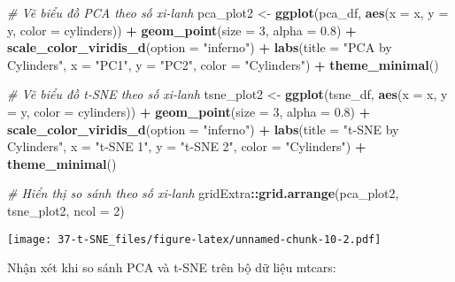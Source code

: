 \documentclass[
]{article}
\newenvironment{Shaded}{\begin{snugshade}}{\end{snugshade}}
\newcommand{\AttributeTok}[1]{\textcolor[rgb]{0.13,0.29,0.53}{#1}}
\newcommand{\CommentTok}[1]{\textcolor[rgb]{0.56,0.35,0.01}{\textit{#1}}}
\newcommand{\DecValTok}[1]{\textcolor[rgb]{0.00,0.00,0.81}{#1}}
\newcommand{\FloatTok}[1]{\textcolor[rgb]{0.00,0.00,0.81}{#1}}
\newcommand{\FunctionTok}[1]{\textcolor[rgb]{0.13,0.29,0.53}{\textbf{#1}}}
\newcommand{\NormalTok}[1]{#1}
\newcommand{\OtherTok}[1]{\textcolor[rgb]{0.56,0.35,0.01}{#1}}
\newcommand{\SpecialCharTok}[1]{\textcolor[rgb]{0.81,0.36,0.00}{\textbf{#1}}}
\newcommand{\StringTok}[1]{\textcolor[rgb]{0.31,0.60,0.02}{#1}}
\begin{document}
\begin{Shaded}
\begin{Highlighting}[]
\CommentTok{\# Vẽ biểu đồ PCA theo số xi{-}lanh}
\NormalTok{pca\_plot2 }\OtherTok{\textless{}{-}} \FunctionTok{ggplot}\NormalTok{(pca\_df, }\FunctionTok{aes}\NormalTok{(}\AttributeTok{x =}\NormalTok{ x, }\AttributeTok{y =}\NormalTok{ y, }\AttributeTok{color =}\NormalTok{ cylinders)) }\SpecialCharTok{+}
  \FunctionTok{geom\_point}\NormalTok{(}\AttributeTok{size =} \DecValTok{3}\NormalTok{, }\AttributeTok{alpha =} \FloatTok{0.8}\NormalTok{) }\SpecialCharTok{+}
  \FunctionTok{scale\_color\_viridis\_d}\NormalTok{(}\AttributeTok{option =} \StringTok{"inferno"}\NormalTok{) }\SpecialCharTok{+}
  \FunctionTok{labs}\NormalTok{(}\AttributeTok{title =} \StringTok{"PCA by Cylinders"}\NormalTok{,}
       \AttributeTok{x =} \StringTok{"PC1"}\NormalTok{,}
       \AttributeTok{y =} \StringTok{"PC2"}\NormalTok{,}
       \AttributeTok{color =} \StringTok{"Cylinders"}\NormalTok{) }\SpecialCharTok{+}
  \FunctionTok{theme\_minimal}\NormalTok{()}

\CommentTok{\# Vẽ biểu đồ t{-}SNE theo số xi{-}lanh}
\NormalTok{tsne\_plot2 }\OtherTok{\textless{}{-}} \FunctionTok{ggplot}\NormalTok{(tsne\_df, }\FunctionTok{aes}\NormalTok{(}\AttributeTok{x =}\NormalTok{ x, }\AttributeTok{y =}\NormalTok{ y, }\AttributeTok{color =}\NormalTok{ cylinders)) }\SpecialCharTok{+}
  \FunctionTok{geom\_point}\NormalTok{(}\AttributeTok{size =} \DecValTok{3}\NormalTok{, }\AttributeTok{alpha =} \FloatTok{0.8}\NormalTok{) }\SpecialCharTok{+}
  \FunctionTok{scale\_color\_viridis\_d}\NormalTok{(}\AttributeTok{option =} \StringTok{"inferno"}\NormalTok{) }\SpecialCharTok{+}
  \FunctionTok{labs}\NormalTok{(}\AttributeTok{title =} \StringTok{"t{-}SNE by Cylinders"}\NormalTok{,}
       \AttributeTok{x =} \StringTok{"t{-}SNE 1"}\NormalTok{,}
       \AttributeTok{y =} \StringTok{"t{-}SNE 2"}\NormalTok{,}
       \AttributeTok{color =} \StringTok{"Cylinders"}\NormalTok{) }\SpecialCharTok{+}
  \FunctionTok{theme\_minimal}\NormalTok{()}

\CommentTok{\# Hiển thị so sánh theo số xi{-}lanh}
\NormalTok{gridExtra}\SpecialCharTok{::}\FunctionTok{grid.arrange}\NormalTok{(pca\_plot2, tsne\_plot2, }\AttributeTok{ncol =} \DecValTok{2}\NormalTok{)}
\end{Highlighting}
\end{Shaded}

\texttt{[image: 37-t-SNE\_files/figure-latex/unnamed-chunk-10-2.pdf]}

Nhận xét khi so sánh PCA và t-SNE trên bộ dữ liệu mtcars:
\end{document}
